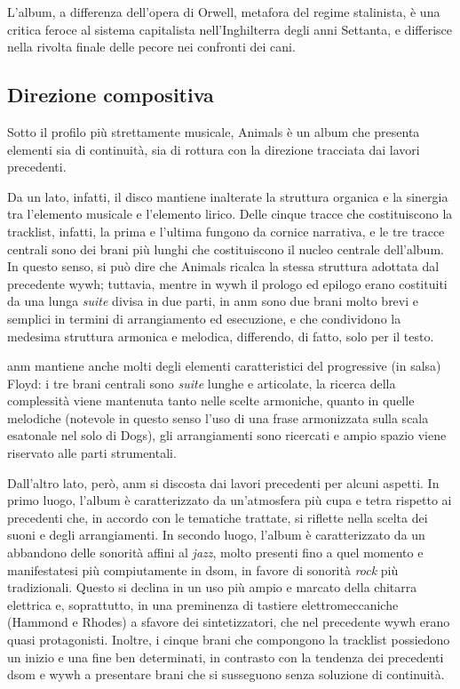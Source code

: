 \documentclass[class=book, crop=false, oneside, 12pt]{standalone}
\begin{document}
    L'album, a differenza dell'opera di Orwell, metafora del regime stalinista, è una critica feroce al sistema capitalista nell'Inghilterra degli anni Settanta, e differisce nella rivolta finale delle pecore nei confronti dei cani.

    \subsection{Direzione compositiva}
    \label{subsec:animals-songwriting}
    Sotto il profilo più strettamente musicale, Animals è un album che presenta elementi sia di continuità, sia di rottura con la direzione tracciata dai lavori precedenti. 
    
    Da un lato, infatti, il disco mantiene inalterate la struttura organica e la sinergia tra l'elemento musicale e l'elemento lirico. Delle cinque tracce che costituiscono la tracklist, infatti, la prima e l'ultima fungono  da cornice narrativa, e le tre tracce centrali sono dei brani più lunghi che costituiscono il nucleo centrale dell'album. In questo senso, si può dire che Animals ricalca la stessa struttura adottata dal precedente \acrlong{wywh}; tuttavia, mentre in \acrshort{wywh} il prologo ed epilogo erano costituiti da una lunga \emph{suite} divisa in due parti, in \acrshort{anm} sono due brani molto brevi e semplici in termini di arrangiamento ed esecuzione, e che condividono la medesima struttura armonica e melodica, differendo, di fatto, solo per il testo. 

    \acrshort{anm} mantiene anche molti degli elementi caratteristici del progressive (in salsa) Floyd: i tre brani centrali sono \emph{suite} lunghe e articolate, la ricerca della complessità viene mantenuta tanto nelle scelte armoniche, quanto in quelle melodiche (notevole in questo senso l'uso di una frase armonizzata sulla scala esatonale nel solo di Dogs), gli arrangiamenti sono ricercati e ampio spazio viene riservato alle parti strumentali.

    Dall'altro lato, però, \acrshort{anm} si discosta dai lavori precedenti per alcuni aspetti. In primo luogo, l'album è caratterizzato da un'atmosfera più cupa e tetra rispetto ai precedenti che, in accordo con le tematiche trattate, si riflette nella scelta dei suoni e degli arrangiamenti. In secondo luogo, l'album è caratterizzato da un abbandono delle sonorità affini al \emph{jazz}, molto presenti fino a quel momento e manifestatesi più compiutamente in \acrshort{dsom}, in favore di sonorità \emph{rock} più tradizionali. Questo si declina  in un uso più ampio e marcato della chitarra elettrica e, soprattutto, in una preminenza di tastiere elettromeccaniche (Hammond e Rhodes) a sfavore dei sintetizzatori, che nel precedente \acrshort{wywh} erano quasi protagonisti. Inoltre, i cinque brani che compongono la tracklist possiedono un inizio e una fine ben determinati, in contrasto con la tendenza dei precedenti \acrshort{dsom} e \acrshort{wywh} a presentare brani che si susseguono senza soluzione di continuità. 
\end{document}
